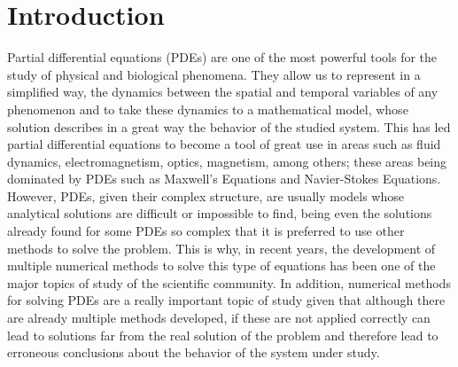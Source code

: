 \documentclass[12pt,letterpaper]{article}
\begin{document}
\section{Introduction}

Partial differential equations (PDEs) are one of the most powerful tools for the study of physical and biological phenomena. They allow us to represent in a simplified way, the dynamics between the spatial and temporal variables of any phenomenon and to take these dynamics to a mathematical model, whose solution describes in a great way the behavior of the studied system\cite{logan2014applied}. This has led partial differential equations to become a tool of great use in areas such as fluid dynamics, electromagnetism, optics, magnetism, among others\cite{farlow1993partial}; these areas being dominated by PDEs such as Maxwell's Equations and Navier-Stokes Equations. \\

However, PDEs, given their complex structure, are usually models whose analytical solutions are difficult or impossible to find, being even the solutions already found for some PDEs so complex that it is preferred to use other methods to solve the problem\cite{strauss2007partial}. This is why, in recent years, the development of multiple numerical methods to solve this type of equations has been one of the major topics of study of the scientific community. In addition, numerical methods for solving PDEs are a really important topic of study given that although there are already multiple methods developed, if these are not applied correctly can lead to solutions far from the real solution of the problem and therefore lead to erroneous conclusions about the behavior of the system under study.\\
\end{document}
